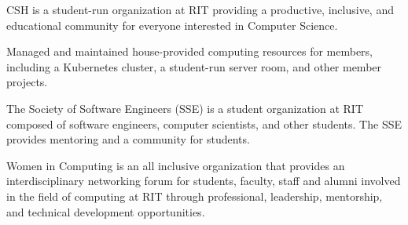 \medskip


\medskip


\smallskip
\smallskip


\medskip
{}

CSH is a student-run organization at RIT providing a productive, inclusive, and educational community for everyone interested in Computer Science.

\smallskip

Managed and maintained house-provided computing resources for members, including a Kubernetes cluster, a student-run server room, and other member projects.

\divider

The Society of Software Engineers (SSE) is a student organization at RIT composed of software engineers, computer scientists, and other students. The SSE provides mentoring and a community for students.

\divider

Women in Computing is an all inclusive organization that provides an interdisciplinary networking forum for students, faculty, staff and alumni involved in the field of computing at RIT through professional, leadership, mentorship, and technical development opportunities.



